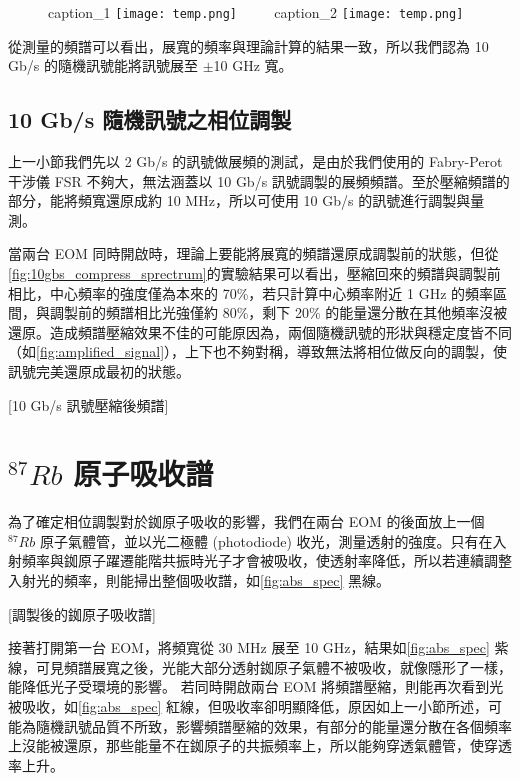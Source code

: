 \documentclass[class=NCU_thesis, crop=false]{standalone}
\begin{document}
\begin{figure}[!hbt]
    \centering
    \subcaptionbox
        {caption\_1
        \label{fig:subfig_fig1}}
        {\texttt{[image: temp.png]}}
    ~~~~
    \subcaptionbox
        {caption\_2
        \label{fig:subfig_fig2}}
        {\texttt{[image: temp.png]}}
\end{figure}

從測量的頻譜可以看出，展寬的頻率與理論計算的結果一致，所以我們認為 10 Gb/s 的隨機訊號能將訊號展至 $\pm$10 GHz 寬。

\subsection{10 Gb/s 隨機訊號之相位調製}

上一小節我們先以 2 Gb/s 的訊號做展頻的測試，是由於我們使用的 Fabry-Perot 干涉儀 FSR 不夠大，無法涵蓋以 10 Gb/s 訊號調製的展頻頻譜。至於壓縮頻譜的部分，能將頻寬還原成約 10 MHz，所以可使用 10 Gb/s 的訊號進行調製與量測。

當兩台 EOM 同時開啟時，理論上要能將展寬的頻譜還原成調製前的狀態，但從\cref{fig:10gbs_compress_sprectrum}的實驗結果可以看出，壓縮回來的頻譜與調製前相比，中心頻率的強度僅為本來的 70\%，若只計算中心頻率附近 1 GHz 的頻率區間，與調製前的頻譜相比光強僅約 80\%，剩下 20\% 的能量還分散在其他頻率沒被還原。造成頻譜壓縮效果不佳的可能原因為，兩個隨機訊號的形狀與穩定度皆不同（如\cref{fig:amplified_signal}），上下也不夠對稱，導致無法將相位做反向的調製，使訊號完美還原成最初的狀態。

[10 Gb/s 訊號壓縮後頻譜]

\section{$^{87}Rb$ 原子吸收譜}

為了確定相位調製對於銣原子吸收的影響，我們在兩台 EOM 的後面放上一個 $^{87}Rb$ 原子氣體管，並以光二極體 (photodiode) 收光，測量透射的強度。只有在入射頻率與銣原子躍遷能階共振時光子才會被吸收，使透射率降低，所以若連續調整入射光的頻率，則能掃出整個吸收譜，如\cref{fig:abs_spec} 黑線。

[調製後的銣原子吸收譜]

接著打開第一台 EOM，將頻寬從 30 MHz 展至 10 GHz，結果如\cref{fig:abs_spec} 紫線，可見頻譜展寬之後，光能大部分透射銣原子氣體不被吸收，就像隱形了一樣，能降低光子受環境的影響。
若同時開啟兩台 EOM 將頻譜壓縮，則能再次看到光被吸收，如\cref{fig:abs_spec} 紅線，但吸收率卻明顯降低，原因如上一小節所述，可能為隨機訊號品質不所致，影響頻譜壓縮的效果，有部分的能量還分散在各個頻率上沒能被還原，那些能量不在銣原子的共振頻率上，所以能夠穿透氣體管，使穿透率上升。
\end{document}
